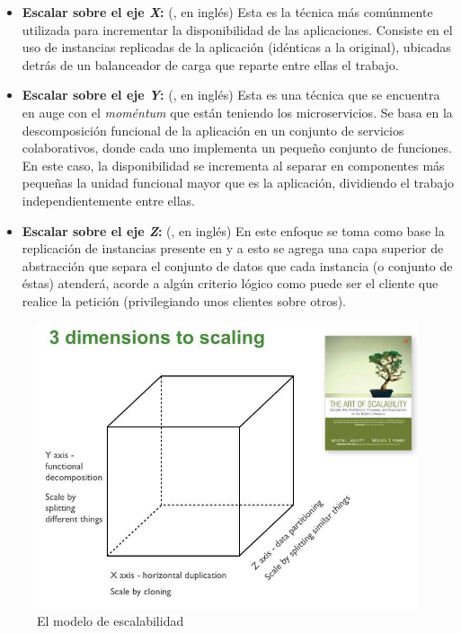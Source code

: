 \begin{itemize}
  \item \textbf{Escalar sobre el eje \textit{X}:} (, en inglés) Esta es la técnica más comúnmente utilizada para incrementar la disponibilidad de las aplicaciones. Consiste en el uso de instancias replicadas de la aplicación (idénticas a la original), ubicadas detrás de un balanceador de carga que reparte entre ellas el trabajo.
  \item \textbf{Escalar sobre el eje \textit{Y}:} (, en inglés) Esta es una técnica que se encuentra en auge con el \textit{moméntum} que están teniendo los microservicios. Se basa en la descomposición funcional de la aplicación en un conjunto de servicios colaborativos, donde cada uno implementa un pequeño conjunto de funciones. En este caso, la disponibilidad se incrementa al separar en componentes más pequeñas la unidad funcional mayor que es la aplicación, dividiendo el trabajo independientemente entre ellas.
  \item \textbf{Escalar sobre el eje \textit{Z}:} (, en inglés) En este enfoque se toma como base la replicación de instancias presente en  y a esto se agrega una capa superior de abstracción que separa el conjunto de datos que cada instancia (o conjunto de éstas) atenderá, acorde a algún criterio lógico como puede ser el cliente que realice la petición (privilegiando unos clientes sobre otros).
\end{itemize}

\begin{figure}[H]
  \includegraphics[width=\linewidth]{src/images/04-capitulo-4/scale_cube.jpg}
  \caption{El modelo de escalabilidad }
  \label{fig:scale-cube}
\end{figure}

